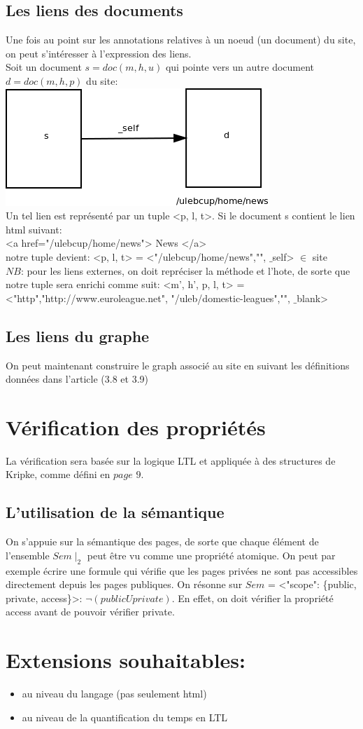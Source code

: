 \documentclass[a4paper]{article}
\begin{document}
\subsection*{ Les liens des documents\\ }
Une fois au point sur les annotations relatives à un noeud (un document) du site, on peut s'intéresser à l'expression des liens.\\
Soit un document $s = doc(m,h,u)$ qui pointe vers un autre document $d = doc(m,h,p)$ du site:\\
\includegraphics[scale=0.6]{lienSimple.png}\\
Un tel lien est représenté par un tuple <p, l, t>. Si le document s contient le lien html suivant:\\
<a href="/ulebcup/home/news"> News </a>\\
notre tuple devient: <p, l, t> = <"/ulebcup/home/news","", $\_$self> $\in$ site\\
$NB$: pour les liens externes, on doit repréciser la méthode et l'hote, de sorte que notre tuple sera enrichi comme suit: <m', h', p, l, t> = <"http","http://www.euroleague.net",
"/uleb/domestic-leagues","", $\_$blank>\\
\subsection*{ Les liens du graphe\\ }
On peut maintenant construire le graph associé au site en suivant les définitions données dans l'article (3.8 et 3.9)\\
\section*{ Vérification des propriétés \\ }
La vérification sera basée sur la logique LTL et appliquée à des structures de Kripke, comme défini en $page$ $9$.\\
\subsection*{ L'utilisation de la sémantique }
On s'appuie sur la sémantique des pages, de sorte que chaque élément de l'ensemble $Sem \mid_2$ peut être vu comme une propriété atomique. On peut par exemple écrire une formule qui vérifie que les pages privées ne sont pas accessibles directement depuis les pages publiques. On résonne sur $Sem$ = <"scope": \{public, private, access\}>: $\neg(public U private)$. En effet, on doit vérifier la propriété access avant de pouvoir vérifier private.\\
\section*{ Extensions souhaitables: }
\begin{itemize}
\item au niveau du langage (pas seulement html)
\item au niveau de la quantification du temps en LTL
\end{itemize}
\end{document}
